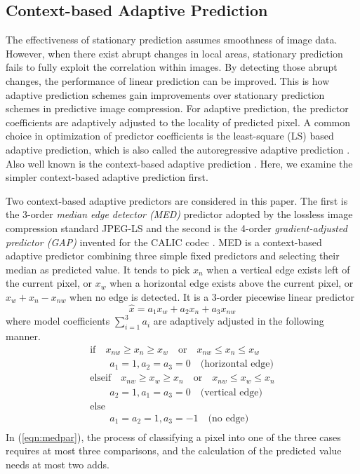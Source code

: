 \documentclass[journal]{IEEEtran}
\begin{document}
\subsection{Context-based Adaptive Prediction}\label{sub:cap}

The effectiveness of stationary prediction assumes smoothness of image data. However, when there
exist abrupt changes in local areas, stationary prediction fails to fully exploit the correlation
within images. By detecting those abrupt changes, the performance of linear prediction can be
improved. This is how adaptive prediction schemes gain improvements over stationary prediction
schemes in predictive image compression. For adaptive prediction, the predictor coefficients are
adaptively adjusted to the locality of predicted pixel. A common choice in optimization of predictor
coefficients is the least-square (LS) based adaptive prediction, which is also called the
autoregressive adaptive prediction \cite{Wu98icip,Li01edp,Kau05lsap}. Also well known is the
context-based adaptive prediction \cite{Memon97predictors}. Here, we examine the simpler
context-based adaptive prediction first.

Two context-based adaptive predictors are considered in this paper. The first is the 3-order
\emph{median edge detector (MED)} predictor adopted by the lossless image compression standard
JPEG-LS \cite{Loco00ip} and the second is the 4-order \emph{gradient-adjusted predictor (GAP)}
invented for the CALIC codec \cite{Wu97calic2,Wu97calic}. MED is a context-based adaptive predictor
combining three simple fixed predictors and selecting their median as predicted value. It tends to
pick $x_n$ when a vertical edge exists left of the current pixel, or $x_w$ when a horizontal edge
exists above the current pixel, or $x_w + x_n - x_{nw}$ when no edge is detected. It is a 3-order
piecewise linear predictor 
\begin{equation}\label{eqn:edpo3}
    \hat{x} = a_1x_{w} + a_2x_{n} + a_3x_{nw}
\end{equation}
where model coefficients $\sum_{i=1}^3 a_i$ are adaptively adjusted in the following manner. 
\begin{equation}\label{eqn:medpar}
    \begin{array}{l}
	\mbox{if} \quad x_{nw} \ge x_n \ge x_w \quad \mbox{or} \quad x_{nw} \le x_n \le x_w \\
	\quad \quad a_1 = 1, a_2 = a_3 = 0 \quad\mbox{(horizontal edge)} \\
	\mbox{elseif} \quad x_{nw} \ge x_w \ge x_n \quad \mbox{or} \quad x_{nw} \le x_w \le x_n \\
	\quad \quad a_2 = 1, a_1 = a_3 = 0 \quad\mbox{(vertical edge)} \\
	\mbox{else} \\
	\quad \quad a_1 = a_2 = 1, a_3 = -1 \quad\mbox{(no edge)} \\
    \end{array}
\end{equation}
In (\ref{eqn:medpar}), the process of classifying a pixel into one of the three cases requires at
most three comparisons, and the calculation of the predicted value needs at most two adds.
\end{document}
